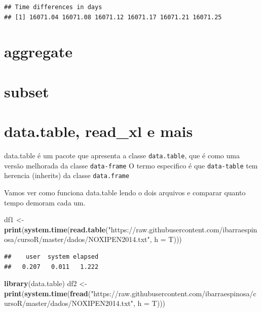 \documentclass[]{book}
\newenvironment{Shaded}{\begin{snugshade}}{\end{snugshade}}
\newcommand{\KeywordTok}[1]{\textcolor[rgb]{0.13,0.29,0.53}{\textbf{#1}}}
\newcommand{\DataTypeTok}[1]{\textcolor[rgb]{0.13,0.29,0.53}{#1}}
\newcommand{\StringTok}[1]{\textcolor[rgb]{0.31,0.60,0.02}{#1}}
\newcommand{\NormalTok}[1]{#1}
\theoremstyle{definition}
\theoremstyle{definition}
\theoremstyle{definition}
\theoremstyle{remark}
\begin{document}
\begin{verbatim}
## Time differences in days
## [1] 16071.04 16071.08 16071.12 16071.17 16071.21 16071.25
\end{verbatim}

\section{aggregate}\label{aggregate}

\section{subset}\label{subset}

\section{data.table, read\_xl e mais}\label{data.table-read_xl-e-mais}

data.table é um pacote que apresenta a classe \texttt{data.table}, que é
como uma versão melhorada da classe \texttt{data-frame} O termo
especifico é que \texttt{data-table} tem herencia (inherits) da classe
\texttt{data.frame}

Vamos ver como funciona data.table lendo o dois arquivos e comparar
quanto tempo demoram cada um.

\begin{Shaded}
\begin{Highlighting}[]
\NormalTok{df1 <-}\StringTok{ }\KeywordTok{print}\NormalTok{(}\KeywordTok{system.time}\NormalTok{(}\KeywordTok{read.table}\NormalTok{(}\StringTok{"https://raw.githubusercontent.com/ibarraespinosa/cursoR/master/dados/NOXIPEN2014.txt"}\NormalTok{, }\DataTypeTok{h =}\NormalTok{ T)))}
\end{Highlighting}
\end{Shaded}

\begin{verbatim}
##    user  system elapsed 
##   0.207   0.011   1.222
\end{verbatim}

\begin{Shaded}
\begin{Highlighting}[]
\KeywordTok{library}\NormalTok{(data.table)}
\NormalTok{df2 <-}\StringTok{ }\KeywordTok{print}\NormalTok{(}\KeywordTok{system.time}\NormalTok{(}\KeywordTok{fread}\NormalTok{(}\StringTok{"https://raw.githubusercontent.com/ibarraespinosa/cursoR/master/dados/NOXIPEN2014.txt"}\NormalTok{, }\DataTypeTok{h =}\NormalTok{ T)))}
\end{Highlighting}
\end{Shaded}
\end{document}
